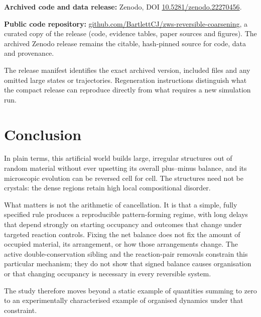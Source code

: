 \documentclass[11pt,a4paper]{article}
\begin{document}
\noindent\textbf{Archived code and data release:} Zenodo, DOI \href{https://doi.org/10.5281/zenodo.22270456}{\mbox{10.5281/zenodo.22270456}}.

\noindent\textbf{Public code repository:} \href{https://github.com/BartlettCJ/zws-reversible-coarsening}{github.com/BartlettCJ/zws-reversible-coarsening}, a curated copy of the release (code, evidence tables, paper sources and figures). The archived Zenodo release remains the citable, hash-pinned source for code, data and provenance.

The release manifest identifies the exact archived version, included files and any omitted large states or trajectories. Regeneration instructions distinguish what the compact release can reproduce directly from what requires a new simulation run.


\section{Conclusion}
In plain terms, this artificial world builds large, irregular structures out of random material without ever upsetting its overall plus--minus balance, and its microscopic evolution can be reversed cell for cell. The structures need not be crystals: the dense regions retain high local compositional disorder.

What matters is not the arithmetic of cancellation. It is that a simple, fully specified rule produces a reproducible pattern-forming regime, with long delays that depend strongly on starting occupancy and outcomes that change under targeted reaction controls. Fixing the net balance does not fix the amount of occupied material, its arrangement, or how those arrangements change. The active double-conservation sibling and the reaction-pair removals constrain this particular mechanism; they do not show that signed balance causes organisation or that changing occupancy is necessary in every reversible system.

The study therefore moves beyond a static example of quantities summing to zero to an experimentally characterised example of organised dynamics under that constraint.
\end{document}
